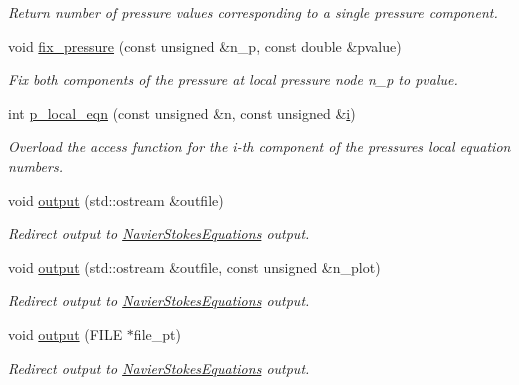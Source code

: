 \begin{DoxyCompactItemize}
\begin{DoxyCompactList}\small\item\em Return number of pressure values corresponding to a single pressure component. \end{DoxyCompactList}\item 
void \hyperlink{classoomph_1_1LinearisedAxisymmetricQTaylorHoodElement_a2ab848b1e9ed7c950071e7bd7ad9d39d}{fix\+\_\+pressure} (const unsigned \&n\+\_\+p, const double \&pvalue)
\begin{DoxyCompactList}\small\item\em Fix both components of the pressure at local pressure node n\+\_\+p to pvalue. \end{DoxyCompactList}\item 
int \hyperlink{classoomph_1_1LinearisedAxisymmetricQTaylorHoodElement_af3c9dcb0cf542f7cdd4fd21b1f6e3e64}{p\+\_\+local\+\_\+eqn} (const unsigned \&n, const unsigned \&\hyperlink{cfortran_8h_adb50e893b86b3e55e751a42eab3cba82}{i})
\begin{DoxyCompactList}\small\item\em Overload the access function for the i-\/th component of the pressure\textquotesingle{}s local equation numbers. \end{DoxyCompactList}\item 
void \hyperlink{classoomph_1_1LinearisedAxisymmetricQTaylorHoodElement_a00768ef22cca932f04e2e10b0f779c48}{output} (std\+::ostream \&outfile)
\begin{DoxyCompactList}\small\item\em Redirect output to \hyperlink{classoomph_1_1NavierStokesEquations}{Navier\+Stokes\+Equations} output. \end{DoxyCompactList}\item 
void \hyperlink{classoomph_1_1LinearisedAxisymmetricQTaylorHoodElement_a7d3a4a80bfc52257b5c9b5af6ed18f72}{output} (std\+::ostream \&outfile, const unsigned \&n\+\_\+plot)
\begin{DoxyCompactList}\small\item\em Redirect output to \hyperlink{classoomph_1_1NavierStokesEquations}{Navier\+Stokes\+Equations} output. \end{DoxyCompactList}\item 
void \hyperlink{classoomph_1_1LinearisedAxisymmetricQTaylorHoodElement_ae6f718cf66bb753eccb3393c03ecfc4f}{output} (F\+I\+LE $\ast$file\+\_\+pt)
\begin{DoxyCompactList}\small\item\em Redirect output to \hyperlink{classoomph_1_1NavierStokesEquations}{Navier\+Stokes\+Equations} output. \end{DoxyCompactList}\item 

\end{DoxyCompactItemize}
